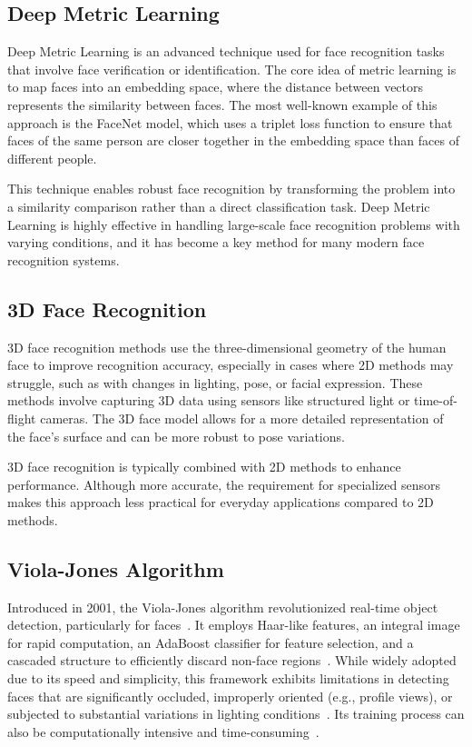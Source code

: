 \subsection{Deep Metric Learning}
Deep Metric Learning is an advanced technique used for face recognition tasks that involve face verification or identification. The core idea of metric learning is to map faces into an embedding space, where the distance between vectors represents the similarity between faces. The most well-known example of this approach is the FaceNet model, which uses a triplet loss function to ensure that faces of the same person are closer together in the embedding space than faces of different people.

This technique enables robust face recognition by transforming the problem into a similarity comparison rather than a direct classification task. Deep Metric Learning is highly effective in handling large-scale face recognition problems with varying conditions, and it has become a key method for many modern face recognition systems.

\subsection{3D Face Recognition}
3D face recognition methods use the three-dimensional geometry of the human face to improve recognition accuracy, especially in cases where 2D methods may struggle, such as with changes in lighting, pose, or facial expression. These methods involve capturing 3D data using sensors like structured light or time-of-flight cameras. The 3D face model allows for a more detailed representation of the face's surface and can be more robust to pose variations.

3D face recognition is typically combined with 2D methods to enhance performance. Although more accurate, the requirement for specialized sensors makes this approach less practical for everyday applications compared to 2D methods.

\subsection{Viola-Jones Algorithm}
Introduced in 2001, the Viola-Jones algorithm revolutionized real-time object detection, particularly for faces~\cite{wijaya_trends_2025}. It employs Haar-like features, an integral image for rapid computation, an AdaBoost classifier for feature selection, and a cascaded structure to efficiently discard non-face regions~\cite{wijaya_trends_2025}. While widely adopted due to its speed and simplicity, this framework exhibits limitations in detecting faces that are significantly occluded, improperly oriented (e.g., profile views), or subjected to substantial variations in lighting conditions~\cite{researchgate_evaluation_2023, wijaya_trends_2025}. Its training process can also be computationally intensive and time-consuming~\cite{researchgate_evaluation_2023}.